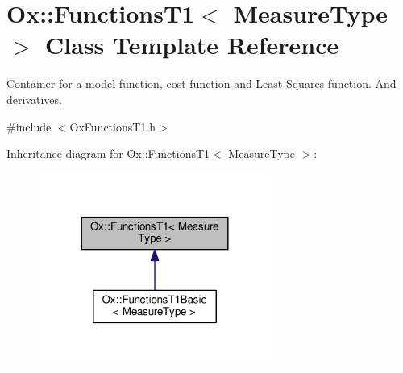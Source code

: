 \hypertarget{class_ox_1_1_functions_t1}{\section{Ox\-:\-:Functions\-T1$<$ Measure\-Type $>$ Class Template Reference}
\label{class_ox_1_1_functions_t1}
}


Container for a model function, cost function and Least-\/\-Squares function. And derivatives.  




{\ttfamily \#include $<$Ox\-Functions\-T1.\-h$>$}



Inheritance diagram for Ox\-:\-:Functions\-T1$<$ Measure\-Type $>$\-:
\nopagebreak
\begin{figure}[H]
\begin{center}
\leavevmode
\includegraphics[width=216pt]{class_ox_1_1_functions_t1__inherit__graph}
\end{center}
\end{figure}
